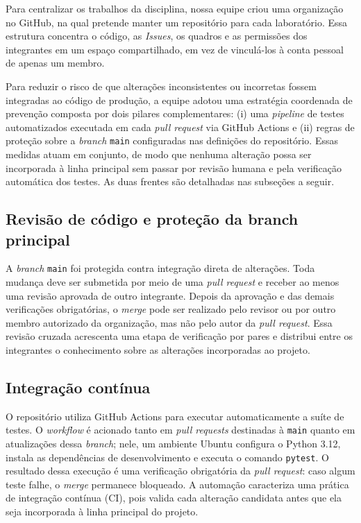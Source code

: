 \documentclass[
	article,			%
	11pt,				%
	oneside,			%
	a4paper,			%
	english,			%
	brazil,				%
	sumario=tradicional
	]{abntex2}
\begin{document}
Para centralizar os trabalhos da disciplina, nossa equipe criou uma organização no GitHub, na qual pretende manter um repositório para cada laboratório. Essa estrutura concentra o código, as \textit{Issues}, os quadros e as permissões dos integrantes em um espaço compartilhado, em vez de vinculá-los à conta pessoal de apenas um membro.

Para reduzir o risco de que alterações inconsistentes ou incorretas fossem integradas ao código de produção, a equipe adotou uma estratégia coordenada de prevenção composta por dois pilares complementares: (i) uma \textit{pipeline} de testes automatizados executada em cada \textit{pull request} via GitHub Actions e (ii) regras de proteção sobre a \textit{branch} \texttt{main} configuradas nas definições do repositório. Essas medidas atuam em conjunto, de modo que nenhuma alteração possa ser incorporada à linha principal sem passar por revisão humana e pela verificação automática dos testes. As duas frentes são detalhadas nas subseções a seguir.

\subsection{Revisão de código e proteção da branch principal}

A \textit{branch} \texttt{main} foi protegida contra integração direta de alterações. Toda mudança deve ser submetida por meio de uma \textit{pull request} e receber ao menos uma revisão aprovada de outro integrante. Depois da aprovação e das demais verificações obrigatórias, o \textit{merge} pode ser realizado pelo revisor ou por outro membro autorizado da organização, mas não pelo autor da \textit{pull request}. Essa revisão cruzada acrescenta uma etapa de verificação por pares e distribui entre os integrantes o conhecimento sobre as alterações incorporadas ao projeto.

\subsection{Integração contínua}

O repositório utiliza GitHub Actions para executar automaticamente a suíte de testes. O \textit{workflow} é acionado tanto em \textit{pull requests} destinadas à \texttt{main} quanto em atualizações dessa \textit{branch}; nele, um ambiente Ubuntu configura o Python 3.12, instala as dependências de desenvolvimento e executa o comando \texttt{pytest}. O resultado dessa execução é uma verificação obrigatória da \textit{pull request}: caso algum teste falhe, o \textit{merge} permanece bloqueado. A automação caracteriza uma prática de integração contínua (CI), pois valida cada alteração candidata antes que ela seja incorporada à linha principal do projeto.
\end{document}
